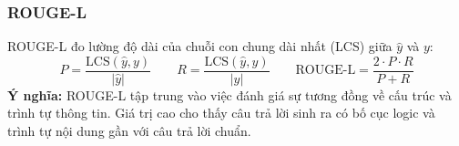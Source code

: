 \subsubsection{ROUGE-L}

ROUGE-L \cite{lin2004rouge} đo lường độ dài của chuỗi con chung dài nhất (LCS) giữa $\hat{y}$ và $y$:
\[
  P = \frac{\text{LCS}(\hat{y}, y)}{|\hat{y}|}
  \qquad
  R = \frac{\text{LCS}(\hat{y}, y)}{|y|}
  \qquad
  \text{ROUGE-L} = \frac{2 \cdot P \cdot R}{P + R}
\]
\textbf{Ý nghĩa:} ROUGE-L tập trung vào việc đánh giá sự tương đồng về cấu trúc và trình tự thông
tin. Giá trị cao cho thấy câu trả lời sinh ra có bố cục logic và trình tự nội dung gần với câu trả
lời chuẩn.